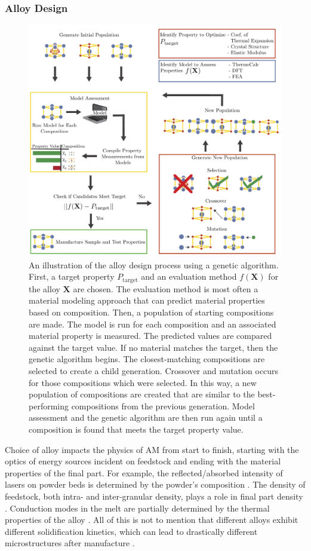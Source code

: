 \subsubsection{Alloy Design}

\begin{figure}
	\includegraphics[width=1\linewidth]{Images/AlloyDesign}
	\caption{An illustration of the alloy design process using a genetic algorithm. First, a target property $P_\text{target}$ and an evaluation method $f(\mathbf{X})$ for the alloy $\mathbf{X}$ are chosen. The evaluation method is most often a material modeling approach that can predict material properties based on composition. Then, a population of starting compositions are made. The model is run for each composition and an associated material property is measured. The predicted values are compared against the target value. If no material matches the target, then the genetic algorithm begins. The closest-matching compositions are selected to create a child generation. Crossover and mutation occurs for those compositions which were selected. In this way, a new population of compositions are created that are similar to the best-performing compositions from the previous generation. Model assessment and the genetic algorithm are then run again until a composition is found that meets the target property value.}
	\label{fig:GA}
\end{figure}
Choice of alloy impacts the physics of AM from start to finish, starting with the optics of energy sources incident on feedstock and ending with the material properties of the final part. For example, the reflected/absorbed intensity of lasers on powder beds is determined by the powder's composition \cite{Boley2016, Trapp2017}. The density of feedstock, both intra- and inter-granular density, plays a role in final part density \cite{Bi2013}. Conduction modes in the melt are partially determined by the thermal properties of the alloy \cite{Martin2017}. All of this is not to mention that different alloys exhibit different solidification kinetics, which can lead to drastically different microstructures after manufacture \cite{Collins2016}. 

